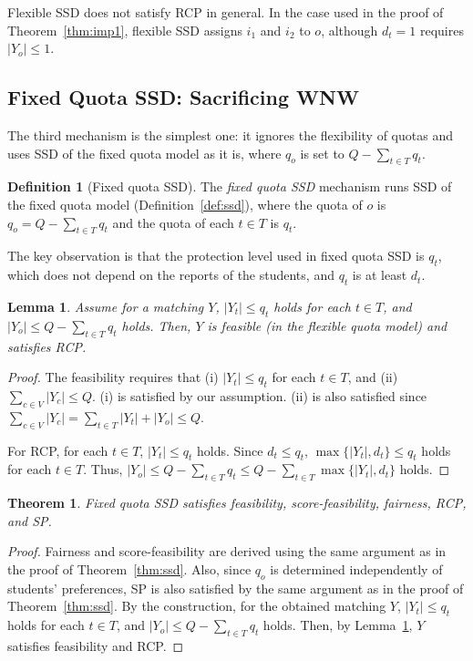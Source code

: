 \documentclass[a4paper,twoside]{article}
\newtheorem{theorem}{Theorem}
\newtheorem{lemma}{Lemma}
\theoremstyle{definition}
\newtheorem{definition}{Definition}
\begin{document}
Flexible SSD does not satisfy RCP in general.
In the case used in the proof of Theorem~\ref{thm:imp1}, flexible SSD assigns $i_1$ and
$i_2$ to $o$, although $d_t=1$ requires $|Y_o|\le 1$.

\subsection{Fixed Quota SSD: Sacrificing WNW}

The third mechanism is the simplest one: it ignores the flexibility of quotas and
uses SSD of the fixed quota model as it is, 
where $q_o$ is set to $Q - \sum_{t\in T} q_t$.

\begin{definition}[Fixed quota SSD]
\label{def:fqssd}
The \emph{fixed quota SSD} mechanism runs SSD of the fixed quota model
(Definition~\ref{def:ssd}), where the quota of $o$ is $q_o=Q-\sum_{t\in T}q_t$ and the
quota of each $t\in T$ is $q_t$.
\end{definition}

The key observation is that the protection level used in fixed quota SSD is $q_t$,
which does not depend on the reports of the students, and $q_t$ is at least $d_t$.

\begin{lemma}
\label{lem:fixedrcp}
Assume for a matching $Y$, 
$|Y_t|\le q_t$ holds for each $t\in T$,
and $|Y_o| \leq Q - \sum_{t \in T} q_t$ holds. 
Then, $Y$ is feasible (in the flexible quota model) 
and satisfies RCP.
\end{lemma}
\begin{proof}
The feasibility requires that (i) $|Y_t| \leq q_t$ for each 
$t \in T$, and (ii) $\sum_{c \in V} |Y_c| \leq Q$. 
(i) is satisfied by our assumption. 
(ii) is also satisfied since 
$\sum_{c \in V} |Y_c| = \sum_{t \in T} |Y_t| + |Y_o| 
\leq Q$. 

For RCP, for each $t\in T$, $|Y_t|\leq q_t$ holds. 
Since $d_t \leq q_t$, $\max\{|Y_t|,d_t\} \leq q_t$ holds
for each $t \in T$. 
Thus, $|Y_o| \le Q - \sum_{t \in T} q_t 
\le  Q - \sum_{t \in T} \max\{|Y_t|,d_t\}$ holds. 
\end{proof}

\begin{theorem}
\label{thm:fqssd}
Fixed quota SSD satisfies feasibility, score-feasibility, fairness, RCP, and SP.
\end{theorem}
\begin{proof}
Fairness and score-feasibility are derived using the same 
argument as in the proof of Theorem~\ref{thm:ssd}.
Also, since $q_o$ is determined independently of 
students' preferences, SP is also satisfied by the same 
argument as in the proof of Theorem~\ref{thm:ssd}.
By the construction, for the obtained matching $Y$, 
$|Y_t|\le q_t$ holds for each $t\in T$,
and $|Y_o| \leq Q - \sum_{t \in T} q_t$ holds. 
Then, by Lemma~\ref{lem:fixedrcp},
$Y$ satisfies feasibility and RCP. 
\end{proof}
\end{document}
